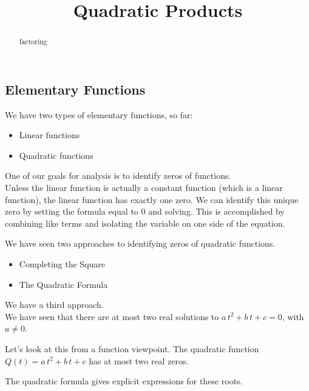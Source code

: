 \documentclass{ximera}
\title{Quadratic Products}
\begin{document}
\begin{abstract}
factoring
\end{abstract}
\maketitle







\subsection{Elementary Functions}

We have two types of elementary functions, so far:

\begin{itemize}
\item Linear functions
\item Quadratic functions
\end{itemize}

One of our goals for analysis is to identify zeros of functions. \\

Unless the linear function is actually a constant function (which is a linear function), the linear function has exactly one zero. We can identify this unique zero by setting the formula equal to $0$ and solving.  This is accomplished by combining like terms and isolating the variable on one side of the equation.

We have seen two approaches to identifying zeros of quadratic functions.
\begin{itemize}
\item Completing the Square
\item {The Quadratic Formula}
\end{itemize}

We have a third approach. \\









We have seen that there are at most two real solutions to $a \, t^2 + b \, t + c = 0$, with $a \ne 0$. 

Let's look at this from a function viewpoint.  The quadratic function  $Q(t) = a \, t^2 + b \, t + c$ has at most two real zeros.  

The quadratic formula gives explicit expressions for these roots.
\end{document}
